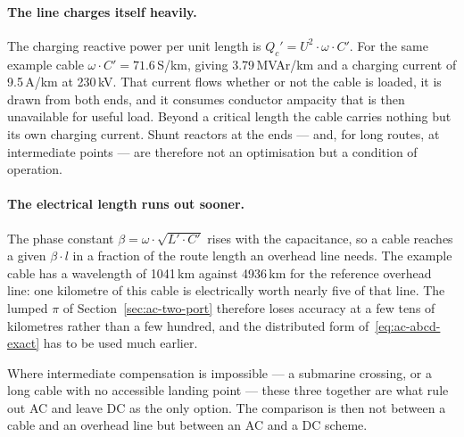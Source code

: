 \paragraph{The line charges itself heavily.} The charging reactive power per
unit length is $Q_c' = U^2 \cdot \omega \cdot C'$. For the same example
cable $\omega \cdot C' = 71.6$\,\textmu S/km, giving 3.79\,MVAr/km and a
charging current of 9.5\,A/km at 230\,kV. That current flows whether or not
the cable is loaded, it is drawn from both ends, and it consumes conductor
ampacity that is then unavailable for useful load. Beyond a critical length
the cable carries nothing but its own charging current. Shunt reactors at
the ends --- and, for long routes, at intermediate points --- are therefore
not an optimisation but a condition of operation.

\paragraph{The electrical length runs out sooner.} The phase constant
$\beta = \omega \cdot \sqrt{L' \cdot C'}$ rises with the capacitance, so a
cable reaches a given $\beta \cdot l$ in a fraction of the route length an
overhead line needs. The example cable has a wavelength of 1041\,km against
4936\,km for the reference overhead line: one kilometre of this cable is
electrically worth nearly five of that line. The lumped $\pi$ of
Section~\ref{sec:ac-two-port} therefore loses accuracy at a few tens of
kilometres rather than a few hundred, and the distributed form
of~\eqref{eq:ac-abcd-exact} has to be used much earlier.

Where intermediate compensation is impossible --- a submarine crossing, or a
long cable with no accessible landing point --- these three together are
what rule out AC and leave DC as the only option. The comparison is then not
between a cable and an overhead line but between an AC and a DC scheme.

\FloatBarrier
